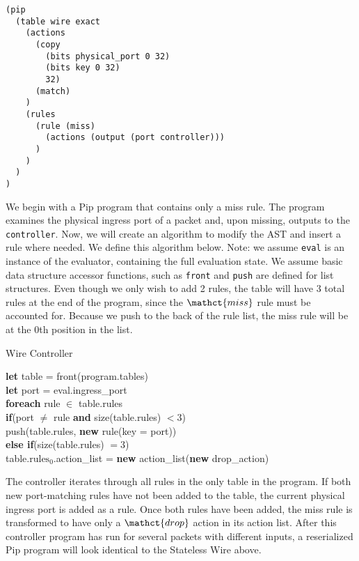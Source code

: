 \begin{mdframed}
\begin{verbatim}
(pip
  (table wire exact
    (actions
      (copy
        (bits physical_port 0 32)
        (bits key 0 32)
        32)
      (match)
    )
    (rules
      (rule (miss)
        (actions (output (port controller)))
      )
    )
  )
)
\end{verbatim}
\end{mdframed}
We begin with a Pip program that contains only a miss rule. The program examines the physical ingress port of a packet and, upon missing, outputs to the \texttt{controller}. Now, we will create an algorithm to modify the AST and insert a rule where needed. We define this algorithm below. Note: we assume \texttt{eval} is an instance of the evaluator, containing the full evaluation state. We assume basic data structure accessor functions, such as \texttt{front} and \texttt{push} are defined for list structures. Even though we only wish to add 2 rules, the table will have 3 total rules at the end of the program, since the $\mathct{miss}$ rule must be accounted for. Because we push to the back of the rule list, the miss rule will be at the 0th position in the list.
\begin{algorithm}
\caption{Wire Controller}
\textbf{let} table = front(program.tables)\\
\textbf{let} port = eval.ingress\_port\\
\textbf{foreach} rule $\in$ table.rules\\
\tab\textbf{if}(port $\neq$ rule \textbf{and} size(table.rules) $< 3$)\\
\tab\tab push(table.rules, \textbf{new} rule(key = port))\\
\tab\textbf{else if}(size(table.rules) $= 3$)\\
\tab\tab table.$\textrm{rules}_0$.action\_list = \textbf{new} action\_list(\textbf{new} drop\_action)
\end{algorithm}
The controller iterates through all rules in the only table in the program. If both new port-matching rules have not been added to the table, the current physical ingress port is added as a rule. Once both rules have been added, the miss rule is transformed to have only a $\mathct{drop}$ action in its action list. After this controller program has run for several packets with different inputs, a reserialized Pip program will look identical to the Stateless Wire above.
